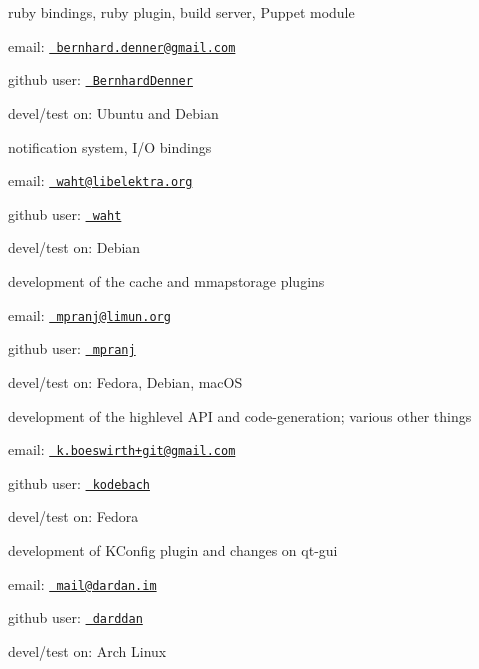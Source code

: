 ruby bindings, ruby plugin, build server, Puppet module


\begin{DoxyItemize}
\item email\+: \href{mailto:bernhard.denner@gmail.com}{\texttt{ bernhard.\+denner@gmail.\+com}}
\item github user\+: \href{https://github.com/BernhardDenner}{\texttt{ Bernhard\+Denner}}
\item devel/test on\+: Ubuntu and Debian
\end{DoxyItemize}

notification system, I/O bindings


\begin{DoxyItemize}
\item email\+: \href{mailto:waht@libelektra.org}{\texttt{ waht@libelektra.\+org}}
\item github user\+: \href{https://github.com/waht}{\texttt{ waht}}
\item devel/test on\+: Debian
\end{DoxyItemize}

development of the cache and mmapstorage plugins


\begin{DoxyItemize}
\item email\+: \href{mailto:mpranj@limun.org}{\texttt{ mpranj@limun.\+org}}
\item github user\+: \href{https://github.com/mpranj}{\texttt{ mpranj}}
\item devel/test on\+: Fedora, Debian, mac\+OS
\end{DoxyItemize}

development of the highlevel A\+PI and code-\/generation; various other things


\begin{DoxyItemize}
\item email\+: \href{mailto:k.boeswirth+git@gmail.com}{\texttt{ k.\+boeswirth+git@gmail.\+com}}
\item github user\+: \href{https://github.com/kodebach}{\texttt{ kodebach}}
\item devel/test on\+: Fedora
\end{DoxyItemize}

development of K\+Config plugin and changes on qt-\/gui


\begin{DoxyItemize}
\item email\+: \href{mailto:mail@dardan.im}{\texttt{ mail@dardan.\+im}}
\item github user\+: \href{https://github.com/darddan}{\texttt{ darddan}}
\item devel/test on\+: Arch Linux 
\end{DoxyItemize}